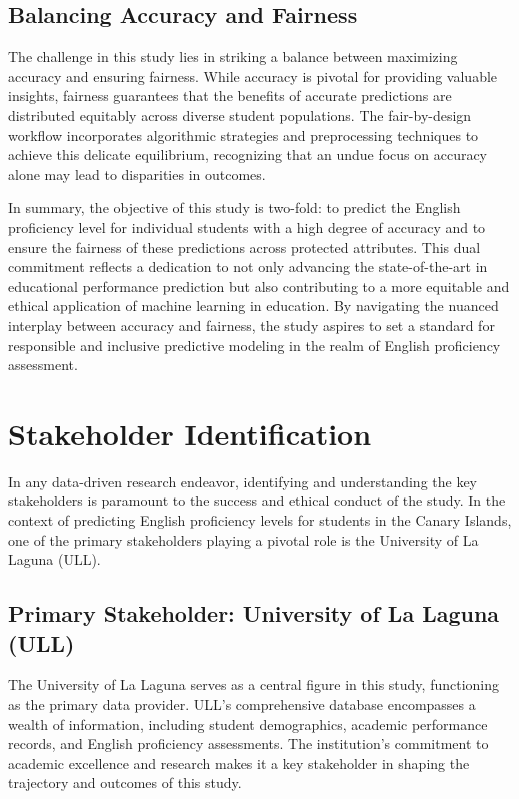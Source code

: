 \documentclass[12pt,a4paper,openright,twoside]{book}
\begin{document}
\subsection{Balancing Accuracy and Fairness}

The challenge in this study lies in striking a balance between maximizing accuracy and ensuring fairness. While accuracy is pivotal for providing valuable insights, fairness guarantees that the benefits of accurate predictions are distributed equitably across diverse student populations. The fair-by-design workflow incorporates algorithmic strategies and preprocessing techniques to achieve this delicate equilibrium, recognizing that an undue focus on accuracy alone may lead to disparities in outcomes.

In summary, the objective of this study is two-fold: to predict the English proficiency level for individual students with a high degree of accuracy and to ensure the fairness of these predictions across protected attributes. This dual commitment reflects a dedication to not only advancing the state-of-the-art in educational performance prediction but also contributing to a more equitable and ethical application of machine learning in education. By navigating the nuanced interplay between accuracy and fairness, the study aspires to set a standard for responsible and inclusive predictive modeling in the realm of English proficiency assessment.

\section{Stakeholder Identification}

In any data-driven research endeavor, identifying and understanding the key stakeholders is paramount to the success and ethical conduct of the study. In the context of predicting English proficiency levels for students in the Canary Islands, one of the primary stakeholders playing a pivotal role is the University of La Laguna (ULL).

\subsection{Primary Stakeholder: University of La Laguna (ULL)}

The University of La Laguna serves as a central figure in this study, functioning as the primary data provider. ULL's comprehensive database encompasses a wealth of information, including student demographics, academic performance records, and English proficiency assessments. The institution's commitment to academic excellence and research makes it a key stakeholder in shaping the trajectory and outcomes of this study.
\end{document}
